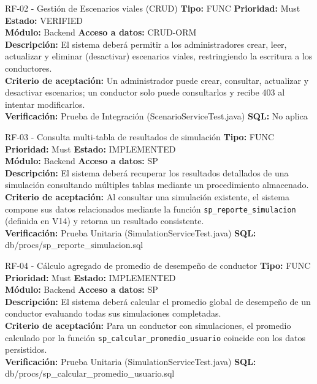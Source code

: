\documentclass[11pt,a4paper]{article}
\begin{document}
\begin{requisito}{RF-02 - Gestión de Escenarios viales (CRUD)}
    \textbf{Tipo:} FUNC \quad \textbf{Prioridad:} Must \quad \textbf{Estado:} VERIFIED \\[0.2cm]
    \textbf{Módulo:} Backend \quad \textbf{Acceso a datos:} CRUD-ORM \\[0.2cm]
    \textbf{Descripción:} El sistema deberá permitir a los administradores crear, leer, actualizar y eliminar (desactivar) escenarios viales, restringiendo la escritura a los conductores. \\[0.2cm]
    \textbf{Criterio de aceptación:} Un administrador puede crear, consultar, actualizar y desactivar escenarios; un conductor solo puede consultarlos y recibe 403 al intentar modificarlos. \\[0.2cm]
    \textbf{Verificación:} Prueba de Integración (ScenarioServiceTest.java) \quad \textbf{SQL:} No aplica
\end{requisito}

\begin{requisito}{RF-03 - Consulta multi-tabla de resultados de simulación}
    \textbf{Tipo:} FUNC \quad \textbf{Prioridad:} Must \quad \textbf{Estado:} IMPLEMENTED \\[0.2cm]
    \textbf{Módulo:} Backend \quad \textbf{Acceso a datos:} SP \\[0.2cm]
    \textbf{Descripción:} El sistema deberá recuperar los resultados detallados de una simulación consultando múltiples tablas mediante un procedimiento almacenado. \\[0.2cm]
    \textbf{Criterio de aceptación:} Al consultar una simulación existente, el sistema compone sus datos relacionados mediante la función \texttt{sp\_reporte\_simulacion} (definida en V14) y retorna un resultado consistente. \\[0.2cm]
    \textbf{Verificación:} Prueba Unitaria (SimulationServiceTest.java) \quad \textbf{SQL:} db/procs/sp\_reporte\_simulacion.sql
\end{requisito}

\begin{requisito}{RF-04 - Cálculo agregado de promedio de desempeño de conductor}
    \textbf{Tipo:} FUNC \quad \textbf{Prioridad:} Must \quad \textbf{Estado:} IMPLEMENTED \\[0.2cm]
    \textbf{Módulo:} Backend \quad \textbf{Acceso a datos:} SP \\[0.2cm]
    \textbf{Descripción:} El sistema deberá calcular el promedio global de desempeño de un conductor evaluando todas sus simulaciones completadas. \\[0.2cm]
    \textbf{Criterio de aceptación:} Para un conductor con simulaciones, el promedio calculado por la función \texttt{sp\_calcular\_promedio\_usuario} coincide con los datos persistidos. \\[0.2cm]
    \textbf{Verificación:} Prueba Unitaria (SimulationServiceTest.java) \quad \textbf{SQL:} db/procs/sp\_calcular\_promedio\_usuario.sql
\end{requisito}
\end{document}
